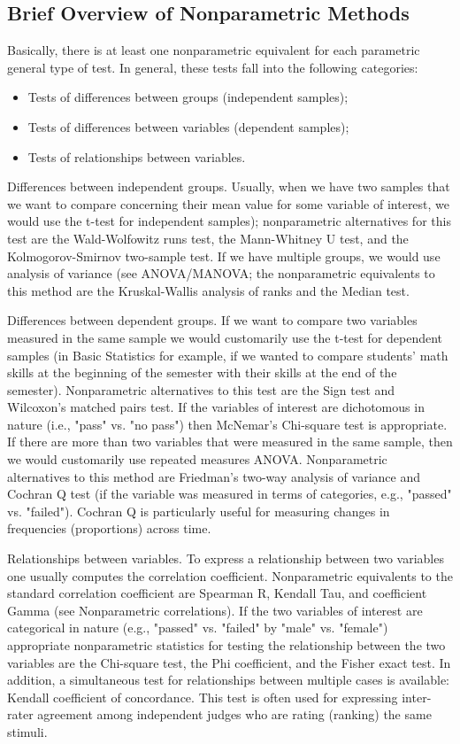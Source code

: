 \subsection{Brief Overview of Nonparametric Methods}

Basically, there is at least one nonparametric equivalent for each parametric general type of test. In general, these tests fall into the following categories:

\begin{itemize}
\item Tests of differences between groups (independent samples);
\item Tests of differences between variables (dependent samples);
\item Tests of relationships between variables.
\end{itemize}

Differences between independent groups. Usually, when we have two samples that we want to compare concerning their mean value for some variable of interest, we would use the t-test for independent samples); nonparametric alternatives for this test are the Wald-Wolfowitz runs test, the Mann-Whitney U test, and the Kolmogorov-Smirnov two-sample test. If we have multiple groups, we would use analysis of variance (see ANOVA/MANOVA; the nonparametric equivalents to this method are the Kruskal-Wallis analysis of ranks and the Median test.

Differences between dependent groups. If we want to compare two variables measured in the same sample we would customarily use the t-test for dependent samples (in Basic Statistics for example, if we wanted to compare students' math skills at the beginning of the semester with their skills at the end of the semester). Nonparametric alternatives to this test are the Sign test and Wilcoxon's matched pairs test. If the variables of interest are dichotomous in nature (i.e., "pass" vs. "no pass") then McNemar's Chi-square test is appropriate. If there are more than two variables that were measured in the same sample, then we would customarily use repeated measures ANOVA. Nonparametric alternatives to this method are Friedman's two-way analysis of variance and Cochran Q test (if the variable was measured in terms of categories, e.g., "passed" vs. "failed"). Cochran Q is particularly useful for measuring changes in frequencies (proportions) across time.

Relationships between variables. 
To express a relationship between two variables one usually computes the correlation coefficient. Nonparametric equivalents to the standard correlation coefficient are Spearman R, Kendall Tau, and coefficient Gamma (see Nonparametric correlations). If the two variables of interest are categorical in nature (e.g., "passed" vs. "failed" by "male" vs. "female") appropriate nonparametric statistics for testing the relationship between the two variables are the Chi-square test, the Phi coefficient, and the Fisher exact test. In addition, a simultaneous test for relationships between multiple cases is available: Kendall coefficient of concordance. This test is often used for expressing inter-rater agreement among independent judges who are rating (ranking) the same stimuli.

